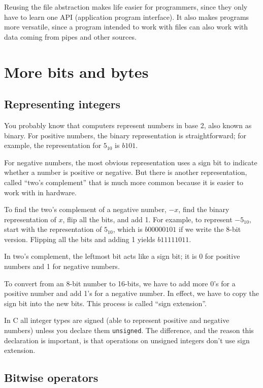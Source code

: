 \documentclass[12pt]{book}
\begin{document}
{Reusing the file abstraction makes life easier for programmers, since
they only have to learn one API (application program interface).
It also makes programs more versatile, since a program intended to
work with files can also work with data coming from pipes and other
sources.



\chapter{More bits and bytes}

\section{Representing integers}

You probably know that computers represent numbers in
base 2, also known as binary.  For positive numbers, the binary
representation is straightforward; for example, the representation
for $5_{10}$ is $b101$.

For negative numbers, the most obvious representation uses
a sign bit to indicate whether a number is positive or negative.
But there is another representation, called ``two's complement''
that is much more common because it is easier to work with
in hardware.

To find the two's complement of a negative number, $-x$, find
the binary representation of $x$, flip all the bits, and add 1.
For example, to represent $-5_{10}$, start with the representation
of $5_{10}$, which is $b0000 0101$ if we write the 8-bit version.
Flipping all the bits and adding 1 yields $b1111 1011$.

In two's complement, the leftmost bit acts like a sign bit;
it is 0 for positive numbers and 1 for negative numbers.

To convert from an 8-bit number to 16-bits, we have to add
more 0's for a positive number and add 1's for a negative number.
In effect, we have to copy the sign bit into the new bits.
This process is called ``sign extension''.

In C all integer types are signed (able to represent positive and
negative numbers) unless you declare them {\tt unsigned}.  The
difference, and the reason this declaration is important, is that
operations on unsigned integers don't use sign extension.


\section{Bitwise operators}

}
\end{document}
